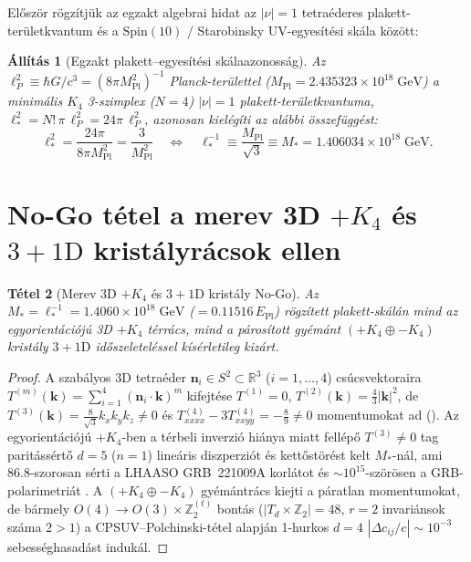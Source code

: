 \documentclass[11pt,a4paper]{article}
\newtheorem{theorem}{Tétel}[section]
\newtheorem{proposition}[theorem]{Állítás}
\begin{document}
Először rögzítjük az egzakt algebrai hidat az $|\nu|=1$ tetraéderes plakett-területkvantum \cite{Olcsak2026JMP} és a $\mathrm{Spin}(10)$ / Starobinsky UV-egyesítési skála \cite{Olcsak2026Paper24,Olcsak2026Paper25,Olcsak2026Paper26} között:
\begin{proposition}[Egzakt plakett--egyesítési skálaazonosság]
\label{prop:scale-identity}
Az $\ell_P^2 \equiv \hbar G/c^3 = (8\pi M_{\mathrm{Pl}}^2)^{-1}$ Planck-területtel ($M_{\mathrm{Pl}} = 2.435323\times 10^{18}\;\mathrm{GeV}$) a minimális $K_4$ 3-szimplex ($N = 4$) $|\nu|=1$ plakett-területkvantuma, $\ell_*^2 = N!\,\pi\,\ell_P^2 = 24\pi\,\ell_P^2$, azonosan kielégíti az alábbi összefüggést:
\begin{equation}
\ell_*^2 = \frac{24\pi}{8\pi M_{\mathrm{Pl}}^2} = \frac{3}{M_{\mathrm{Pl}}^2}
\quad\Longleftrightarrow\quad
\ell_*^{-1} \equiv \frac{M_{\mathrm{Pl}}}{\sqrt{3}} \equiv M_* = 1.406034\times 10^{18}\;\mathrm{GeV}.
\label{eq:scale-id-hu}
\end{equation}
\end{proposition}

\section{No-Go tétel a merev 3D \texorpdfstring{$+K_4$}{+K4} és \texorpdfstring{$3+1\mathrm{D}$}{3+1D} kristályrácsok ellen}
\label{sec:nogo}

\begin{theorem}[Merev 3D $+K_4$ és $3+1\mathrm{D}$ kristály No-Go]
\label{thm:3d-nogo}
Az $M_* = \ell_*^{-1} = 1.4060\times 10^{18}\;\mathrm{GeV}$ ($= 0.11516\,E_{\mathrm{Pl}}$) rögzített plakett-skálán mind az egyorientációjú 3D $+K_4$ térrács, mind a párosított gyémánt $(+K_4\oplus -K_4)$ kristály $3+1\mathrm{D}$ időszeleteléssel kísérletileg kizárt.
\end{theorem}

\begin{proof}
A szabályos 3D tetraéder $\mathbf{n}_i \in S^2 \subset \mathbb{R}^3$ ($i=1,\dots,4$) csúcsvektoraira $T^{(m)}(\mathbf{k}) = \sum_{i=1}^4(\mathbf{n}_i\cdot\mathbf{k})^m$ kifejtése $T^{(1)} = 0$, $T^{(2)}(\mathbf{k}) = \frac{4}{3}|\mathbf{k}|^2$, de $T^{(3)}(\mathbf{k}) = \frac{8}{\sqrt{3}}k_x k_y k_z \neq 0$ és $T^{(4)}_{xxxx} - 3T^{(4)}_{xxyy} = -\frac{8}{9} \neq 0$ momentumokat ad (). Az egyorientációjú $+K_4$-ben a térbeli inverzió hiánya miatt fellépő $T^{(3)} \neq 0$ tag paritássértő $d=5$ ($n=1$) lineáris diszperziót és kettőstörést kelt $M_*$-nál, ami $86.8$-szorosan sérti a LHAASO GRB~221009A korlátot \cite{LHAASO2024LIV} és $\sim 10^{15}$-szörösen a GRB-polarimetriát \cite{Liberati2013}. A $(+K_4\oplus -K_4)$ gyémántrács kiejti a páratlan momentumokat, de bármely $O(4) \to O(3)\times\mathbb{Z}_2^{(t)}$ bontás ($|T_d\times\mathbb{Z}_2| = 48$, $r=2$ invariánsok száma $2 > 1$) a CPSUV--Polchinski-tétel \cite{CPSUV2004,Polchinski2012} alapján 1-hurkos $d=4$ $|\Delta c_{ij}/c| \sim 10^{-3}$ sebességhasadást indukál.
\end{proof}
\end{document}
